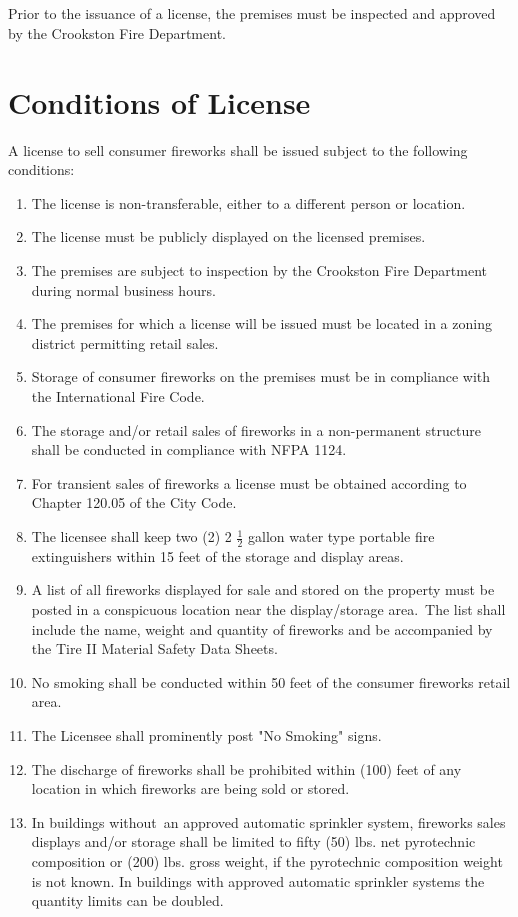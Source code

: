 \subsection{}
Prior to the issuance of a license, the premises must be inspected and approved by the Crookston Fire Department.
\section{Conditions of License}
A license to sell consumer fireworks shall be issued subject to the following conditions:
\begin{enumerate}[{\indent}A)]
    \item The license is non-transferable, either to a different person or location.
    \item The license must be publicly displayed on the licensed premises.
    \item The premises are subject to inspection by the Crookston Fire Department during normal business hours.
    \item The premises for which a license will be issued must be located in a zoning district permitting retail sales.
    \item Storage of consumer fireworks on the premises must be in compliance with the International Fire Code.
    \item The storage and/or retail sales of fireworks in a non-permanent structure shall be conducted in compliance with NFPA 1124.
    \item For transient sales of fireworks a license must be obtained according to Chapter 120.05 of the City Code.
    \item The licensee shall keep two (2) 2 $\frac{1}{2}$ gallon water type portable fire extinguishers within 15 feet of the storage and display areas.
    \item A list of all fireworks displayed for sale and stored on the property must be posted in a conspicuous location near the display/storage area. The list shall include the name, weight and quantity of fireworks and be accompanied by the Tire II Material Safety Data Sheets.
    \item No smoking shall be conducted within 50 feet of the consumer fireworks retail area.
    \item The Licensee shall prominently post "No Smoking" signs.
    \item The discharge of fireworks shall be prohibited within (100) feet of any location in which fireworks are being sold or stored.
    \item In buildings without an approved automatic sprinkler system, fireworks sales displays and/or storage shall be limited to fifty (50) lbs. net pyrotechnic composition or (200) lbs. gross weight, if the pyrotechnic composition weight is not known. In buildings with approved automatic sprinkler systems the quantity limits can be doubled.
\end{enumerate}
